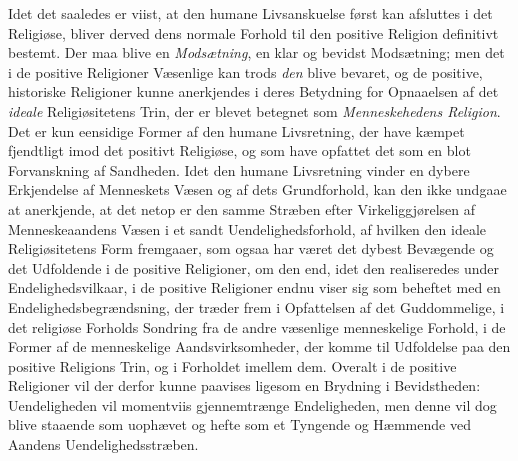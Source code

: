 \documentclass[12pt,a4paper,openany]{book}
\newcommand{\opage}[1]{\marginnote{\footnotesize\textit{[#1]}}}
\begin{document}
Idet det saaledes er viist, at den humane Livsanskuelse
først kan afsluttes i det Religiøse, bliver derved dens normale
\opage{508}Forhold til den positive Religion definitivt bestemt. Der maa
blive en \emph{Modsætning}, en klar og bevidst Modsætning;
men det i de positive Religioner Væsenlige kan trods \emph{den}
blive bevaret, og de positive, historiske Religioner kunne anerkjendes
i deres Betydning for Opnaaelsen af det \emph{ideale}
Religiøsitetens Trin, der er blevet betegnet som \emph{Menneskehedens
Religion}. Det er kun eensidige Former af den
humane Livsretning, der have kæmpet fjendtligt imod det
positivt Religiøse, og som have opfattet det som en blot
Forvanskning af Sandheden. Idet den humane Livsretning
vinder en dybere Erkjendelse af Menneskets Væsen og af
dets Grundforhold, kan den ikke undgaae at anerkjende, at
det netop er den samme Stræben efter Virkeliggjørelsen af
Menneskeaandens Væsen i et sandt Uendelighedsforhold, af
hvilken den ideale Religiøsitetens Form fremgaaer, som ogsaa
har været det dybest Bevægende og det Udfoldende i de positive
Religioner, om den end, idet den realiseredes under Endelighedsvilkaar,
i de positive Religioner endnu viser sig som
beheftet med en Endelighedsbegrændsning, der træder frem
i Opfattelsen af det Guddommelige, i det religiøse Forholds
Sondring fra de andre væsenlige menneskelige Forhold, i de
Former af de menneskelige Aandsvirksomheder, der komme til
Udfoldelse paa den positive Religions Trin, og i Forholdet
imellem dem. Overalt i de positive Religioner vil der derfor
kunne paavises ligesom en Brydning i Bevidstheden: Uendeligheden
vil momentviis gjennemtrænge Endeligheden, men
denne vil dog blive staaende som uophævet og hefte som et
Tyngende og Hæmmende ved Aandens Uendelighedsstræben.
\end{document}
